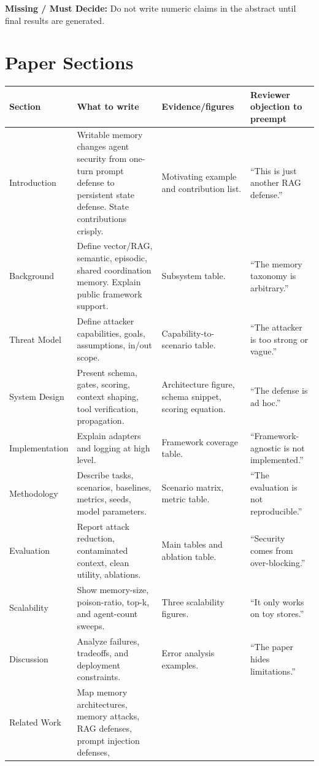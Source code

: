 \documentclass[11pt,oneside]{report}
\newcommand{\missing}{\textbf{Missing / Must Decide: }}
\begin{document}
\missing{} Do not write numeric claims in the abstract until final results are generated.

\section{Paper Sections}

\begin{longtable}{|L{0.15\textwidth}|L{0.25\textwidth}|L{0.25\textwidth}|L{0.25\textwidth}|}
\hline
\textbf{Section} & \textbf{What to write} & \textbf{Evidence/figures} & \textbf{Reviewer objection to
preempt} \\
\hline
Introduction & Writable memory changes agent security from one-turn prompt defense to persistent
state defense. State contributions crisply. & Motivating example and contribution list. & ``This is
just another RAG defense.'' \\
\hline
Background & Define vector/RAG, semantic, episodic, shared coordination memory. Explain public
framework support. & Subsystem table. & ``The memory taxonomy is arbitrary.'' \\
\hline
Threat Model & Define attacker capabilities, goals, assumptions, in/out scope. & Capability-to-
scenario table. & ``The attacker is too strong or vague.'' \\
\hline
System Design & Present schema, gates, scoring, context shaping, tool verification, propagation. &
Architecture figure, schema snippet, scoring equation. & ``The defense is ad hoc.'' \\
\hline
Implementation & Explain adapters and logging at high level. & Framework coverage table. &
``Framework-agnostic is not implemented.'' \\
\hline
Methodology & Describe tasks, scenarios, baselines, metrics, seeds, model parameters. & Scenario
matrix, metric table. & ``The evaluation is not reproducible.'' \\
\hline
Evaluation & Report attack reduction, contaminated context, clean utility, ablations. & Main tables
and ablation table. & ``Security comes from over-blocking.'' \\
\hline
Scalability & Show memory-size, poison-ratio, top-k, and agent-count sweeps. & Three scalability
figures. & ``It only works on toy stores.'' \\
\hline
Discussion & Analyze failures, tradeoffs, and deployment constraints. & Error analysis examples. &
``The paper hides limitations.'' \\
\hline
Related Work & Map memory architectures, memory attacks, RAG defenses, prompt injection defenses,

\end{longtable}
\end{document}
